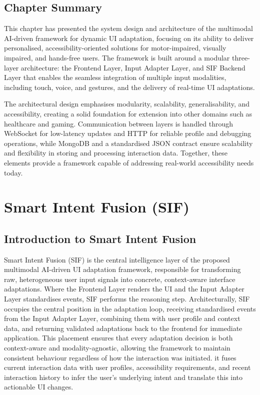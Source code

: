 \documentclass[openany]{book}
\begin{document}
\section{Chapter Summary}
This chapter has presented the system design and architecture of the multimodal AI-driven framework for dynamic UI adaptation, focusing on its ability to deliver personalised, accessibility-oriented solutions for motor-impaired, visually impaired, and hands-free users. The framework is built around a modular three-layer architecture: the Frontend Layer, Input Adapter Layer, and SIF Backend Layer that enables the seamless integration of multiple input modalities, including touch, voice, and gestures, and the delivery of real-time UI adaptations.

The architectural design emphasises modularity, scalability, generalisability, and accessibility, creating a solid foundation for extension into other domains such as healthcare and gaming. Communication between layers is handled through WebSocket for low-latency updates and HTTP for reliable profile and debugging operations, while MongoDB and a standardised JSON contract ensure scalability and flexibility in storing and processing interaction data.
Together, these elements provide a framework capable of addressing real-world accessibility needs today.

\chapter{Smart Intent Fusion (SIF)}
\section{Introduction to Smart Intent Fusion}
Smart Intent Fusion (SIF) is the central intelligence layer of the proposed multimodal AI-driven UI adaptation framework, responsible for transforming raw, heterogeneous user input signals into concrete, context-aware interface adaptations. 
Where the Frontend Layer renders the UI and the Input Adapter Layer standardises events, SIF performs the reasoning step. Architecturally, SIF occupies the central position in the adaptation loop, receiving standardised events from the Input Adapter Layer, combining them with user profile and context data, and returning validated adaptations back to the frontend for immediate application. This placement ensures that every adaptation decision is both context-aware and modality-agnostic, allowing the framework to maintain consistent behaviour regardless of how the interaction was initiated.
it fuses current interaction data with user profiles, accessibility requirements, and recent interaction history to infer the user’s underlying intent and translate this into actionable UI changes.
\end{document}
